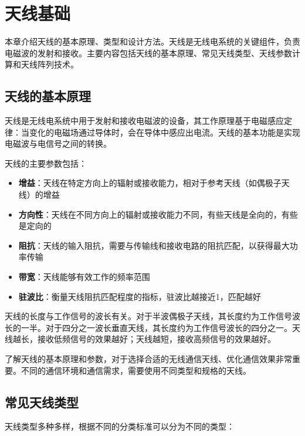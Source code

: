 \documentclass[12pt,UTF8]{ctexbook}
\begin{document}
\chapter{天线基础}

本章介绍天线的基本原理、类型和设计方法。天线是无线电系统的关键组件，负责电磁波的发射和接收。主要内容包括天线的基本原理、常见天线类型、天线参数计算和天线阵列技术。

\section{天线的基本原理}

天线是无线电系统中用于发射和接收电磁波的设备，其工作原理基于电磁感应定律：当变化的电磁场通过导体时，会在导体中感应出电流。天线的基本功能是实现电磁波与电信号之间的转换。

天线的主要参数包括：

\begin{itemize}[leftmargin=3.5em]
    \item \textbf{增益}：天线在特定方向上的辐射或接收能力，相对于参考天线（如偶极子天线）的增益
    \item \textbf{方向性}：天线在不同方向上的辐射或接收能力不同，有些天线是全向的，有些是定向的
    \item \textbf{阻抗}：天线的输入阻抗，需要与传输线和接收电路的阻抗匹配，以获得最大功率传输
    \item \textbf{带宽}：天线能够有效工作的频率范围
    \item \textbf{驻波比}：衡量天线阻抗匹配程度的指标，驻波比越接近1，匹配越好
\end{itemize}

天线的长度与工作信号的波长有关。对于半波偶极子天线，其长度约为工作信号波长的一半。对于四分之一波长垂直天线，其长度约为工作信号波长的四分之一。天线越长，接收低频信号的效果越好；天线越短，接收高频信号的效果越好。

了解天线的基本原理和参数，对于选择合适的无线通信天线、优化通信效果非常重要。不同的通信环境和通信需求，需要使用不同类型和规格的天线。

\section{常见天线类型}

天线类型多种多样，根据不同的分类标准可以分为不同的类型：
\end{document}
